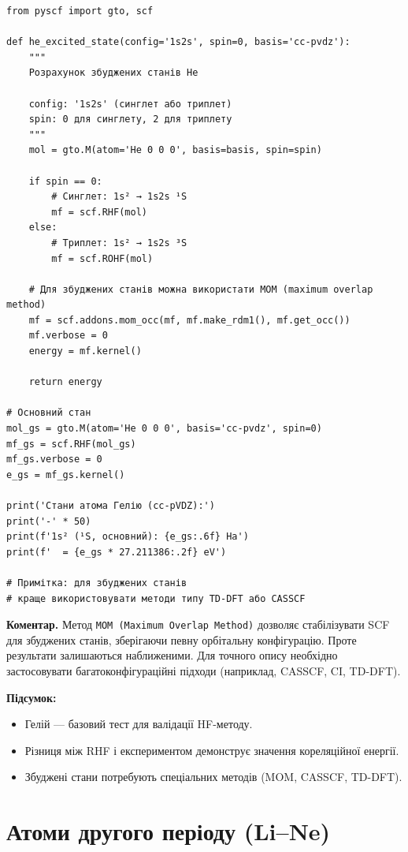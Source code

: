 \begin{verbatim}
from pyscf import gto, scf

def he_excited_state(config='1s2s', spin=0, basis='cc-pvdz'):
    """
    Розрахунок збуджених станів He

    config: '1s2s' (синглет або триплет)
    spin: 0 для синглету, 2 для триплету
    """
    mol = gto.M(atom='He 0 0 0', basis=basis, spin=spin)

    if spin == 0:
        # Синглет: 1s² → 1s2s ¹S
        mf = scf.RHF(mol)
    else:
        # Триплет: 1s² → 1s2s ³S
        mf = scf.ROHF(mol)

    # Для збуджених станів можна використати MOM (maximum overlap method)
    mf = scf.addons.mom_occ(mf, mf.make_rdm1(), mf.get_occ())
    mf.verbose = 0
    energy = mf.kernel()

    return energy

# Основний стан
mol_gs = gto.M(atom='He 0 0 0', basis='cc-pvdz', spin=0)
mf_gs = scf.RHF(mol_gs)
mf_gs.verbose = 0
e_gs = mf_gs.kernel()

print('Стани атома Гелію (cc-pVDZ):')
print('-' * 50)
print(f'1s² (¹S, основний): {e_gs:.6f} Ha')
print(f'  = {e_gs * 27.211386:.2f} eV')

# Примітка: для збуджених станів
# краще використовувати методи типу TD-DFT або CASSCF
\end{verbatim}

\textbf{Коментар.}
Метод \texttt{MOM (Maximum Overlap Method)} дозволяє стабілізувати SCF для збуджених станів,
зберігаючи певну орбітальну конфігурацію. Проте результати залишаються наближеними.
Для точного опису необхідно застосовувати багатоконфігураційні підходи (наприклад, CASSCF, CI, TD-DFT).


\textbf{Підсумок:}
\begin{itemize}
    \item Гелій --- базовий тест для валідації HF-методу.
    \item Різниця між RHF і експериментом демонструє значення кореляційної енергії.
    \item Збуджені стани потребують спеціальних методів (MOM, CASSCF, TD-DFT).
\end{itemize}


\section{Атоми другого періоду (Li--Ne)}

